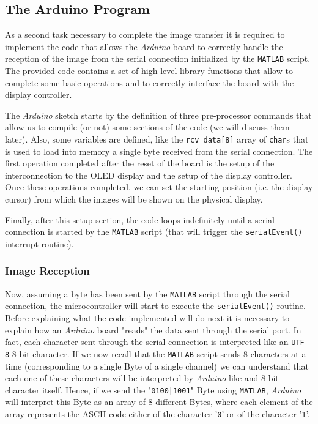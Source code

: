 \documentclass[a4paper]{article}
\begin{document}
    \subsection{The Arduino Program}
        As a second task necessary to complete the image transfer it is required to implement the code that allows the \emph{Arduino} board to correctly handle the reception of the image from the serial connection initialized by the \texttt{MATLAB} script.
        The provided code contains a set of high-level library functions that allow to complete some basic operations and to correctly interface the board with the display controller.

        The \emph{Arduino} sketch starts by the definition of three pre-processor commands that allow us to compile (or not) some sections of the code (we will discuss them later).
        Also, some variables are defined, like the \texttt{rcv\_data[8]} array of \texttt{char}s that is used to load into memory a single byte received from the serial connection.
        The first operation completed after the reset of the board is the setup of the interconnection to the OLED display and the setup of the display controller. Once these operations completed, we can set the starting position (i.e. the display cursor) from which the images will be shown on the physical display.

        Finally, after this setup section, the code loops indefinitely until a serial connection is started by the \texttt{MATLAB} script (that will trigger the \texttt{serialEvent()} interrupt routine).

        \subsubsection{Image Reception}
            Now, assuming a byte has been sent by the \texttt{MATLAB} script through the serial connection, the microcontroller will start to execute the \texttt{serialEvent()} routine.
            Before explaining what the code implemented will do next it is necessary to explain how an \emph{Arduino} board "reads" the data sent through the serial port. In fact, each character sent through the serial connection is interpreted like an \texttt{UTF-8} 8-bit character. If we now recall that the \texttt{MATLAB} script sends 8 characters at a time (corresponding to a single Byte of a single channel) we can understand that each one of these characters will be interpreted by \emph{Arduino} like and 8-bit character itself. Hence, if we send the "\texttt{0100|1001}" Byte using \texttt{MATLAB}, \emph{Arduino} will interpret this Byte as an array of 8 different Bytes, where each element of the array represents the ASCII code either of the character '\texttt{0}' or of the character '\texttt{1}'.
\end{document}
